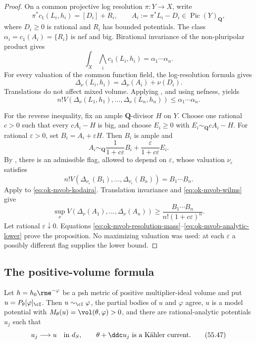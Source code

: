 \begin{proof}
On a common projective log resolution $\pi:Y\to X$, write
\[
 \pi^*c_1(L_i,h_i)=[D_i]+R_i,\qquad
 A_i:=\pi^*L_i-D_i\in\operatorname{Pic}(Y)_{\mathbf Q},
\]
where $D_i\geq0$ is rational and $R_i$ has bounded potentials.  The
class $\alpha_i=c_1(A_i)=\{R_i\}$ is nef and big.  Birational invariance
of the non-pluripolar product gives
\[
 \int_X\bigwedge_i c_1(L_i,h_i)=\alpha_1\cdots\alpha_n.
\tag{55.41}\label{eq:ok-mvob-resolution-mass}
\]
For every valuation of the common function field, the log-resolution
formula \cite[Remark~10.3.1, equation~(10.22)]{XiaBook} gives
\[
 \Delta_\nu(L_i,h_i)=\Delta_\nu(A_i)+\nu(D_i).
\tag{55.42}\label{eq:ok-mvob-resolution-body}
\]
Translations do not affect mixed volume.  Applying
, and using nefness, yields
\[
 n!V(\Delta_\nu(L_1,h_1),\ldots,\Delta_\nu(L_n,h_n))
 \leq\alpha_1\cdots\alpha_n.
\tag{55.43}\label{eq:ok-mvob-analytic-upper}
\]

For the reverse inequality, fix an ample $\mathbf Q$-divisor $H$ on
$Y$.  Choose one rational $c>0$ such that every $cA_i-H$ is big, and
choose $E_i\geq0$ with $E_i\sim_{\mathbf Q}cA_i-H$.  For rational
$\varepsilon>0$, set $B_i=A_i+\varepsilon H$.  Then $B_i$ is ample
and
\[
 A_i\sim_{\mathbf Q}
 \frac1{1+c\varepsilon}B_i
 +\frac{\varepsilon}{1+c\varepsilon}E_i.
\tag{55.44}\label{eq:ok-mvob-kodaira}
\]
By \cite[Theorem~1.1]{Wil25}, there is an admissible flag, allowed to depend
on $\varepsilon$, whose valuation $\nu_\varepsilon$ satisfies
\[
 n!V(\Delta_{\nu_\varepsilon}(B_1),\ldots,
      \Delta_{\nu_\varepsilon}(B_n))=B_1\cdots B_n.
\tag{55.45}\label{eq:ok-mvob-wilms}
\]
Apply  to
\eqref{eq:ok-mvob-kodaira}.  Translation invariance and
\eqref{eq:ok-mvob-wilms} give
\[
 \sup_\nu V(\Delta_\nu(A_1),\ldots,\Delta_\nu(A_n))
 \geq\frac{B_1\cdots B_n}{n!(1+c\varepsilon)^n}.
\tag{55.46}\label{eq:ok-mvob-analytic-lower}
\]
Let rational $\varepsilon\downarrow0$.  Equations
\eqref{eq:ok-mvob-resolution-mass}--\eqref{eq:ok-mvob-analytic-lower}
prove the proposition.  No maximizing valuation was used: at each
$\varepsilon$ a possibly different flag supplies the lower bound.
\end{proof}

\subsection{The positive-volume formula}
\label{sec:ok-mixed-formula}

\begin{lemma}\label{lem:ok-mvob-i-model-approximation}
Let $h=h_0\rme^{-\varphi}$ be a psh metric of positive
multiplier-ideal volume and put $u=P_\theta[\varphi]_{\cI}$.  Then
$u\sim_{\cI}\varphi$, the partial bodies of $u$ and $\varphi$ agree,
$u$ is a model potential with
$M_\theta(u)=\vol(\theta,\varphi)>0$, and there are rational-analytic
potentials $u_j$ such that
\[
 u_j\longrightarrow u\quad\text{in }d_S,\qquad
 \theta+\ddc u_j\ \text{is a K\"ahler current}.
\tag{55.47}\label{eq:ok-mvob-approximating}
\]
\end{lemma}

